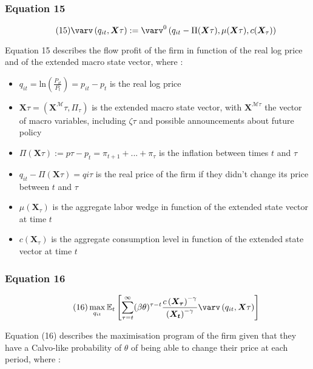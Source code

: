 \documentclass{article}
\begin{document}
\subsubsection*{Equation 15}
\begin{equation}\tag{15}
    \varv\left(q_{it},\bm{X}{\tau}\right):=\varv^{0}\left(q_{it}-\Pi(\bm{X}{\tau}),\mu(\bm{X}{\tau}),c(\bm{X}_{\tau})\right)
\end{equation}

Equation 15 describes the flow profit of the firm in function of the real log price and of the extended macro state vector, where : 
\begin{itemize}
    \item $q_{it}=\text{ln}\left(\frac{P_{it}}{P_{t}}\right)=p_{it}-p_{t}$ is the real log price
    \item $\bm{X}{\tau}=(\bm{X}^{\mathcal{M}}{\tau}, \Pi_{\tau})$ is the extended macro state vector, with $\bm{X}^{\mathcal{M}{\tau}}$ the vector of macro variables, including $\zeta{\tau}$ and possible announcements about future policy
    \item $\Pi\left(\bm{X}{\tau}\right):=p{\tau}-p_{t}=\pi_{t+1}+...+\pi_{\tau}$ is the inflation between times $t$ and $\tau$
    \item $q_{it}-\Pi(\bm{X}{\tau})=q{i\tau}$ is the real price of the firm if they didn't change its price between $t$ and $\tau$
    \item $\mu\left(\bm{X}_{\tau}\right)$ is the aggregate labor wedge in function of the extended state vector at time $t$
    \item $c(\bm{X}_{\tau})$ is the aggregate consumption level in function of the extended state vector at time $t$
\end{itemize}

\subsubsection*{Equation 16}
\begin{equation}\tag{16}
    \max_{q_{it}} \mathbb{E}_{t}\left[\sum_{\tau=t}^{\infty}(\beta\theta)^{\tau-t} \frac{c\left(\bm{X_{\tau}}\right)^{-\gamma}}{\left(\bm{X_{t}}\right)^{-\gamma}} \varv\left(q_{it},\bm{X}{\tau}\right)\right]
\end{equation}

Equation (16) describes the maximisation program of the firm given that they have a Calvo-like probability of $\theta$ of being able to change their price at each period, where : 
\end{document}
